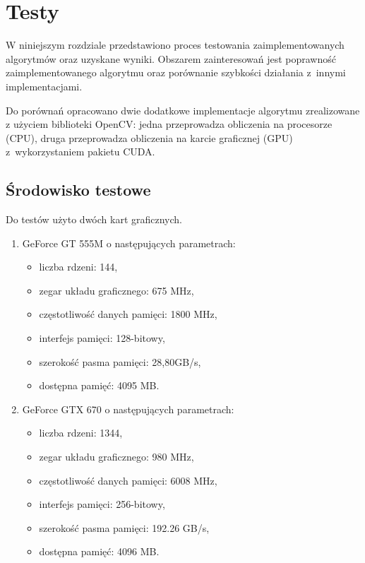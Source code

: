 \chapter{Testy}
\label{cha:testy}

W niniejszym rozdziale przedstawiono proces testowania zaimplementowanych algorytmów oraz uzyskane wyniki. Obszarem zainteresowań jest poprawność zaimplementowanego algorytmu oraz porównanie szybkości działania z~innymi implementacjami.

Do porównań opracowano dwie dodatkowe implementacje algorytmu zrealizowane z użyciem biblioteki OpenCV: jedna przeprowadza obliczenia na procesorze (CPU), druga przeprowadza obliczenia na karcie graficznej (GPU) z~wykorzystaniem pakietu CUDA.

\section{Środowisko testowe}
\label{sec:srodowiskoTesty}

Do testów użyto dwóch kart graficznych.

\begin{enumerate}
\item GeForce GT 555M \cite{GT555M} o następujących parametrach:
\begin{itemize}
\item liczba rdzeni: 144,
\item zegar układu graficznego: 675 MHz,
\item częstotliwość danych pamięci: 1800 MHz,
\item interfejs pamięci: 128-bitowy,
\item szerokość pasma pamięci: 28,80GB/s,
\item dostępna pamięć: 4095 MB.
\end{itemize}

\item GeForce GTX 670 \cite{GTX670} o następujących parametrach:
\begin{itemize}
\item liczba rdzeni: 1344,
\item zegar układu graficznego: 980 MHz,
\item częstotliwość danych pamięci: 6008 MHz,
\item interfejs pamięci: 256-bitowy,
\item szerokość pasma pamięci: 192.26 GB/s,
\item dostępna pamięć: 4096 MB.
\end{itemize}
\end{enumerate}

